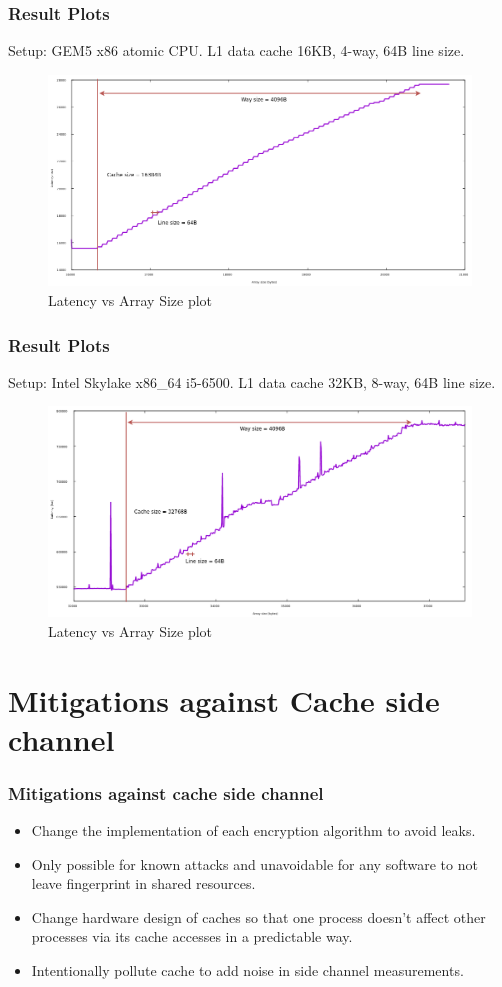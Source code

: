 \documentclass[10pt,usenames,dvipsnames]{beamer}
\begin{document}
\begin{frame}
\frametitle{Result Plots}
Setup: GEM5 x86 atomic CPU. L1 data cache 16KB, 4-way, 64B line size.
\begin{figure}
\includegraphics[width=\textwidth]{reverse_eng_16kb}
\caption{Latency vs Array Size plot}
\end{figure}
\end{frame}

\begin{frame}
\frametitle{Result Plots}
Setup: Intel Skylake x86\_64 i5-6500. L1 data cache 32KB, 8-way, 64B line size.
\begin{figure}
\includegraphics[width=\textwidth]{reverse_eng_32kb}
\caption{Latency vs Array Size plot}
\end{figure}
\end{frame}

\section{Mitigations against Cache side channel}

\begin{frame}
\frametitle{Mitigations against cache side channel}
\begin{itemize}
    \item Change the implementation of each encryption algorithm to avoid leaks.
    \item Only possible for known attacks and unavoidable for any software to not leave fingerprint in shared resources.
    \item Change hardware design of caches so that one process doesn’t affect other processes via its cache accesses in a predictable way.
    \item Intentionally pollute cache to add noise in side channel measurements.
\end{itemize}
\end{frame}
\end{document}

